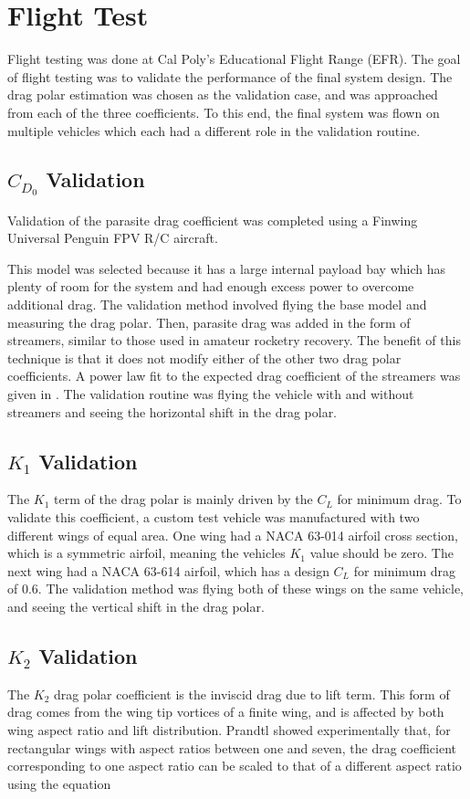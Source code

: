 \chapter{Flight Test}
\label{sect:flightTestSec}
Flight testing was done at Cal Poly's Educational Flight Range (EFR). The goal of flight testing was to validate the performance of the final system design. The drag polar estimation was chosen as the validation case, and was approached from each of the three coefficients. To this end, the final system was flown on multiple vehicles which each had a different role in the validation routine.

\section{$C_{D_0}$ Validation}
Validation of the parasite drag coefficient was completed using a Finwing Universal Penguin FPV R/C aircraft\cite{penguinRC}. 

This model was selected because it has a large internal payload bay which has plenty of room for the system and had enough excess power to overcome additional drag. The validation method involved flying the base model and measuring the drag polar. Then, parasite drag was added in the form of streamers, similar to those used in amateur rocketry recovery. The benefit of this technique is that it does not modify either of the other two drag polar coefficients. A power law fit to the expected drag coefficient of the streamers was given in \cite{Auman2001}. The validation routine was flying the vehicle with and without streamers and seeing the horizontal shift in the drag polar.

\section{$K_1$ Validation}
The $K_1$ term of the drag polar is mainly driven by the $C_L$ for minimum drag. To validate this coefficient, a custom test vehicle was manufactured with two different wings of equal area. One wing had a NACA 63-014 airfoil cross section, which is a symmetric airfoil, meaning the vehicles $K_1$ value should be zero. The next wing had a NACA 63-614 airfoil, which has a design $C_L$ for minimum drag of 0.6. The validation method was flying both of these wings on the same vehicle, and seeing the vertical shift in the drag polar.
\section{$K_2$ Validation}
The $K_2$ drag polar coefficient is the inviscid drag due to lift term. This form of drag comes from the wing tip vortices of a finite wing, and is affected by both wing aspect ratio and lift distribution. Prandtl showed experimentally\cite{prandtl1923applications} that, for rectangular wings with aspect ratios between one and seven, the drag coefficient corresponding to one aspect ratio can be scaled to that of a different aspect ratio using the equation

